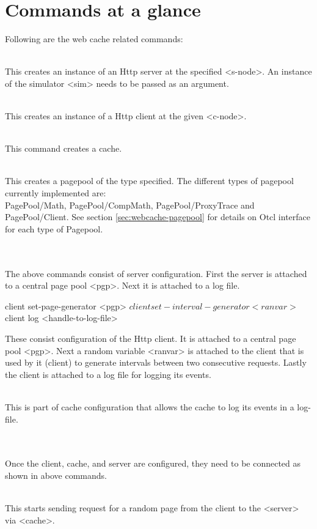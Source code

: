 \section{Commands at a glance}
\label{sec:webcachecommand}

Following are the web cache related commands:
\begin{flushleft}
\\
This creates an instance of an Http server at the specified <s-node>. An
instance of the simulator <sim> needs to be passed as an argument.


\\
This creates an instance of a Http client at the given <c-node>.


\code{set cache [new Http/Cache <sim> <e-node>}\\
This command creates a cache.


\\
This creates a pagepool of the type specified. The different types of pagepool
currently implemented are:\\
PagePool/Math, PagePool/CompMath, PagePool/ProxyTrace and PagePool/Client.
See section \ref{sec:webcache-pagepool} for details on Otcl interface for
each type of Pagepool.


\\
\\
The above commands consist of server configuration. First the server is
attached to a central page pool <pgp>. Next it is attached to a log file.


\begin{program}
client set-page-generator <pgp>
$client set-interval-generator <ranvar> 
$client log <handle-to-log-file>
\end{program}
These consist configuration of the Http client. It is attached to a central
page pool <pgp>. Next a random variable <ranvar> is attached to the client
that is used by it (client) to generate intervals between two consecutive
requests. Lastly the client is attached to a log file for logging its events.


\\
This is part of cache configuration that allows the cache to log its
events in a log-file. 


\\
\\
Once the client, cache, and server are configured, they need to be
connected as shown in above commands.


\\
This starts sending request for a random page from the client to the
<server> via <cache>.

\end{flushleft}
\endinput

